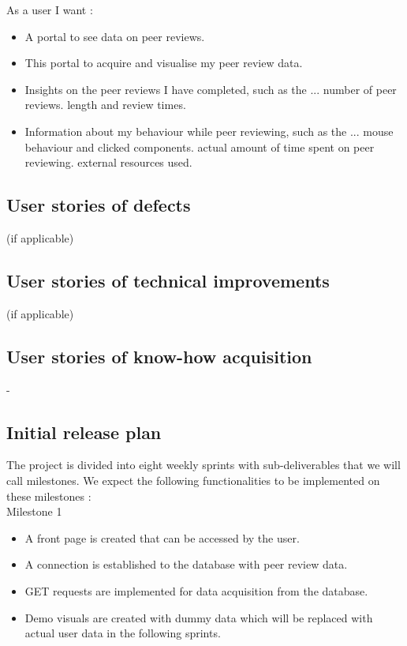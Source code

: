 \documentclass{article}
\begin{document}
    As a user I want :
    
    \begin{itemize}
        \item A portal to see data on peer reviews.
        \item This portal to acquire and visualise my peer review data.
        \item Insights on the peer reviews I have completed, such as the ...
            \subitem number of peer reviews.
            \subitem length and review times.
        \item Information about my behaviour while peer reviewing, such as the ...
            \subitem mouse behaviour and clicked components.
            \subitem actual amount of time spent on peer reviewing.
            \subitem external resources used.
    \end{itemize}
    
    \subsection{User stories of defects} (if applicable)
    \subsection{User stories of technical improvements} (if applicable)
    \subsection{User stories of know-how acquisition} -
    \subsection{Initial release plan}
    
    The project is divided into eight weekly sprints with sub-deliverables that we will call milestones. We expect the following functionalities to be implemented on these milestones :
    \\
    Milestone 1
    \begin{itemize}
        \item A front page is created that can be accessed by the user.
        \item A connection is established to the database with peer review data.
        \item GET requests are implemented for data acquisition from the database.
        \item Demo visuals are created with dummy data which will be replaced with actual user data in the following sprints.
    \end{itemize}
    
\end{document}
